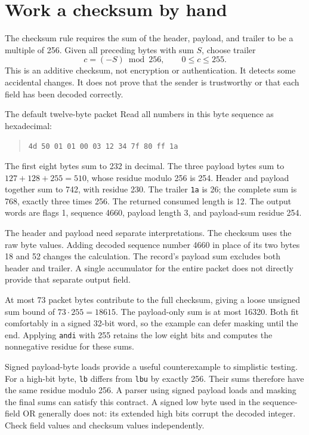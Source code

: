 \section{Work a checksum by hand}
The checksum rule requires the sum of the header, payload, and trailer to be a
multiple of 256. Given all preceding bytes with sum \(S\), choose trailer
\[
  c=(-S)\bmod256,\qquad 0\leq c\leq255.
\]
This is an additive checksum, not encryption or authentication. It detects some
accidental changes. It does not prove that the sender is trustworthy or that each
field has been decoded correctly.

\begin{MARSWorkedExample}{The default twelve-byte packet}
  Read all numbers in this byte sequence as hexadecimal:
  \begin{quote}\texttt{4d 50 01 01 00 03 12 34 7f 80 ff 1a}\end{quote}
  The first eight bytes sum to 232 in decimal. The three payload bytes sum to
  \(127+128+255=510\), whose residue modulo 256 is 254. Header and payload together
  sum to 742, with residue 230. The trailer \texttt{1a} is 26; the complete sum is
  768, exactly three times 256. The returned consumed length is 12. The output words
  are flags 1, sequence 4660, payload length 3, and payload-sum residue 254.
\end{MARSWorkedExample}
The header and payload need separate interpretations. The checksum uses the raw
byte values. Adding decoded sequence number 4660 in place of its two bytes 18 and
52 changes the calculation. The record's payload sum excludes both header and
trailer. A single accumulator for the entire packet does not directly provide that
separate output field.

At most 73 packet bytes contribute to the full checksum, giving a loose unsigned
sum bound of \(73\cdot255=18615\). The payload-only sum is at most 16320. Both fit
comfortably in a signed 32-bit word, so the example can defer masking until the
end. Applying \texttt{andi} with 255 retains the low eight bits and computes the
nonnegative residue for these sums.

Signed payload-byte loads provide a useful counterexample to simplistic testing.
For a high-bit byte, \texttt{lb} differs from \texttt{lbu} by exactly 256. Their sums
therefore have the same residue modulo 256. A parser using signed payload loads
and masking the final sums can satisfy this contract. A signed low byte used in
the sequence-field OR generally does not: its extended high bits corrupt the
decoded integer. Check field values and checksum values independently.
